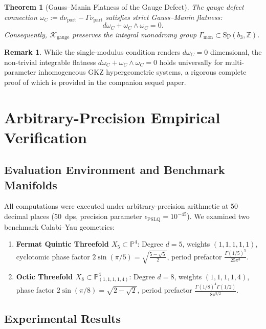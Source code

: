 \documentclass[11pt,a4paper]{article}
\newtheorem{theorem}{Theorem}
\theoremstyle{definition}
\newtheorem{remark}{Remark}
\begin{document}
\begin{theorem}[Gauss--Manin Flatness of the Gauge Defect]
The gauge defect connection $\omega_C := d\nu_{\text{part}} - \Gamma \nu_{\text{part}}$ satisfies strict Gauss--Manin flatness:
\begin{equation}
d\omega_C + \omega_C \wedge \omega_C = 0.
\end{equation}
Consequently, $\mathcal{K}_{\text{gauge}}$ preserves the integral monodromy group $\Gamma_{\text{mon}} \subset \mathrm{Sp}(b_3, \mathbb{Z})$.
\end{theorem}

\begin{remark}
While the single-modulus condition renders $d\omega_C = 0$ dimensional, the non-trivial integrable flatness $d\omega_C + \omega_C \wedge \omega_C = 0$ holds universally for multi-parameter inhomogeneous GKZ hypergeometric systems, a rigorous complete proof of which is provided in the companion sequel paper.
\end{remark}

\section{Arbitrary-Precision Empirical Verification}

\subsection{Evaluation Environment and Benchmark Manifolds}
All computations were executed under arbitrary-precision arithmetic at 50 decimal places ($50$~dps, precision parameter $\epsilon_{\text{PSLQ}} = 10^{-45}$).
We examined two benchmark Calabi--Yau geometries:
\begin{enumerate}
    \item \textbf{Fermat Quintic Threefold $X_5 \subset \mathbb{P}^4$}: Degree $d=5$, weights $(1,1,1,1,1)$, cyclotomic phase factor $2\sin(\pi/5) = \sqrt{\frac{5-\sqrt{5}}{2}}$, period prefactor $\frac{\Gamma(1/5)^5}{25\pi^3}$.
    \item \textbf{Octic Threefold $X_8 \subset \mathbb{P}^4_{(1,1,1,1,4)}$}: Degree $d=8$, weights $(1,1,1,1,4)$, phase factor $2\sin(\pi/8) = \sqrt{2-\sqrt{2}}$, period prefactor $\frac{\Gamma(1/8)^4\Gamma(1/2)}{8\pi^{5/2}}$.
\end{enumerate}

\subsection{Experimental Results}
\end{document}
